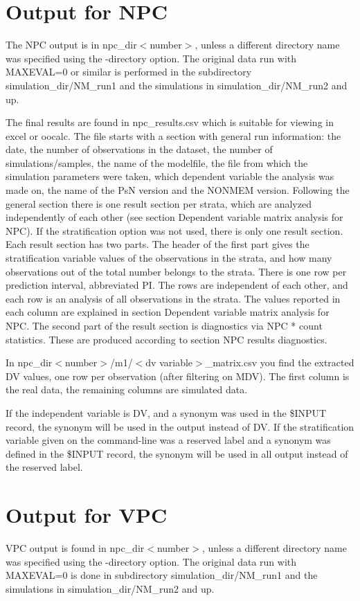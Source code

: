 \section{Output for NPC}
The NPC output is in npc\_dir$<$number$>$, unless a different directory name was specified using the -directory option. The original data run with MAXEVAL=0 or similar is performed in the subdirectory simulation\_dir/NM\_run1 and the simulations in simulation\_dir/NM\_run2 and up. 

The final results are found in npc\_results.csv which is suitable for viewing in excel or oocalc.  The file starts with a section with general run information: the date, the number of observations in the dataset, the number of simulations/samples, the name of the modelfile, the file from which the simulation parameters were taken, which dependent variable the analysis was made on, the name of the PsN version and the NONMEM version. Following the general section there is one result section per strata, which are analyzed independently of each other (see section Dependent variable matrix analysis for NPC). If the stratification option was not used, there is only one result section. Each result section has two parts. The header of the first part gives the stratification variable values of the observations in the strata, and how many observations out of the total number belongs to the strata. There is one row per prediction interval, abbreviated PI. The rows are independent of each other, and each row is an analysis of all observations in the strata. The values reported in each column are explained in section Dependent variable matrix analysis for NPC. The second part of the result section is diagnostics via NPC * count statistics. These are produced according to section NPC results diagnostics.	

In npc\_dir$<$number$>$/m1/$<$dv variable$>$\_matrix.csv you find the extracted DV values, one row per observation (after filtering on MDV). The first column is the real data, the remaining columns are simulated data.

If the independent variable is DV, and a synonym was used in the \$INPUT record, the synonym will be used in the output instead of DV.  If  the stratification variable given on the command-line was a reserved label and a synonym was defined in the \$INPUT record, the synonym will be used in all output instead of the reserved label.

\section{Output for VPC}
VPC output is found in npc\_dir$<$number$>$, unless a different directory name was specified using the -directory option. The original data run with MAXEVAL=0 is done in subdirectory simulation\_dir/NM\_run1 and the simulations in simulation\_dir/NM\_run2 and up. 

